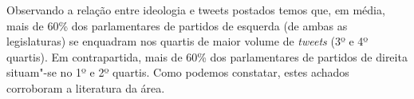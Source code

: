 

Observando a relação entre ideologia e tweets postados temos que, em
média, mais de 60\% dos parlamentares de partidos de esquerda (de ambas
as legislaturas) se enquadram nos quartis de maior volume de
\emph{tweets} (3º e 4º quartis). Em contrapartida, mais de 60\% dos
parlamentares de partidos de direita situam"-se no 1º e 2º quartis. Como
podemos constatar, estes achados corroboram a literatura da área.

